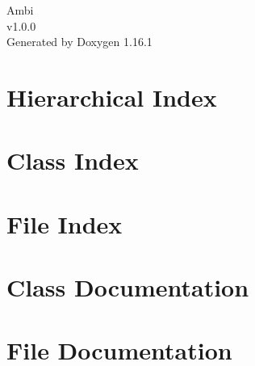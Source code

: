 \documentclass[twoside]{book}
\newcommand{\+}{\discretionary{\mbox{\scriptsize$\hookleftarrow$}}{}{}}
\newcommand{\clearemptydoublepage}{%
    \newpage{\pagestyle{empty}\cleardoublepage}%
  }
\begin{document}
  \raggedbottom
    \hypersetup{pageanchor=false,
                bookmarksnumbered=true,
                pdfencoding=unicode
               }
  \begin{titlepage}
  \vspace*{7cm}
  \begin{center}%
  {\Large Ambi}\\
  [1ex]\large v1.\+0.\+0 \\
  \vspace*{1cm}
  {\large Generated by Doxygen 1.16.1}\\
  \end{center}
  \end{titlepage}
  \clearemptydoublepage
  \tableofcontents
  \clearemptydoublepage
  \hypersetup{pageanchor=true}
\chapter{Hierarchical Index}

\chapter{Class Index}

\chapter{File Index}

\chapter{Class Documentation}



\chapter{File Documentation}






  \backmatter
  \newpage
  \clearemptydoublepage
  \printindex
\end{document}
